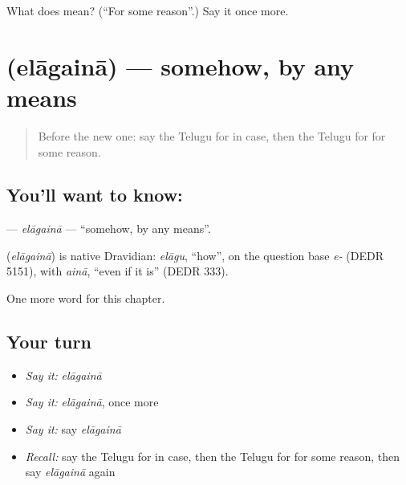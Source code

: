 \begin{tcolorbox}[breakable,colback=teal!4,colframe=teal!35!black,title={Before you move on}]
What does  mean? (\textquotedblleft{}For some reason\textquotedblright{}.) Say it once more.
\end{tcolorbox}
\section[\texorpdfstring{\te{ఎలాగైనా} (elāgainā)}{ఎలాగైనా (elāgainā)}]{ (elāgainā) — somehow, by any means}

\label{lesson:TE-C295-elagaina}



\begin{quote}
Before the new one: say the Telugu for in case, then the Telugu for for some reason.
\end{quote}

\subsection*{You'll want to know: }
\textbf{} — \emph{elāgainā} — \textquotedblleft{}somehow, by any means\textquotedblright{}.

\begin{cousinweb}
\textbf{} (\emph{elāgainā}) is native Dravidian: \emph{elāgu}, \textquotedblleft{}how\textquotedblright{}, on the question base \emph{e-} (DEDR 5151), with \emph{ainā}, \textquotedblleft{}even if it is\textquotedblright{} (DEDR 333).
\end{cousinweb}

\begin{grammarlens}[title={What you've built}]
One more word for this chapter.
\end{grammarlens}

\subsection*{Your turn}
\begin{itemize}
\raggedright
  \item \emph{Say it:} \emph{elāgainā}
  \item \emph{Say it:} \emph{elāgainā}, once more
  \item \emph{Say it:} say \emph{elāgainā}
  \item \emph{Recall:} say the Telugu for in case, then the Telugu for for some reason, then say \emph{elāgainā} again
\end{itemize}

